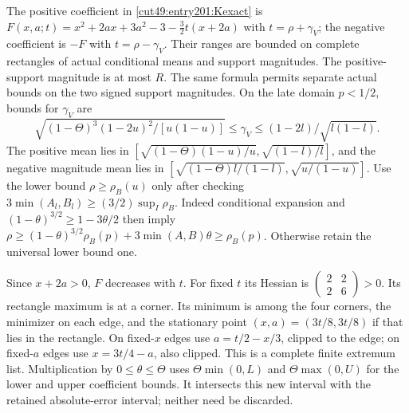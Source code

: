 \documentclass[11pt,a4paper]{article}
\numberwithin{equation}{section}
\theoremstyle{definition}
\theoremstyle{remark}
\begin{document}
The positive coefficient in \eqref{cut49:entry201:Kexact} is
$F(x,a;t)=x^2+2ax+3a^2-3-\tfrac32t(x+2a)$
with $t=\rho+\gamma_V$; the negative coefficient is $-F$
with $t=\rho-\gamma_V$. Their ranges are bounded on complete
rectangles of actual conditional means and support magnitudes.
The positive-support magnitude is at most $R$.
The same formula permits separate actual bounds on the two signed support magnitudes.
On the late domain $p<1/2$, bounds for $\gamma_V$ are
\[
 \sqrt{(1-\Theta)^3(1-2u)^2/[u(1-u)]}
 \le\gamma_V\le(1-2l)/\sqrt{l(1-l)}.
\]
The positive mean lies in
$[\sqrt{(1-\Theta)(1-u)/u},\sqrt{(1-l)/l}]$, and the negative
magnitude mean lies in
$[\sqrt{(1-\Theta)l/(1-l)},\sqrt{u/(1-u)}]$.
Use the lower bound $\rho\ge\rho_B(u)$ only after checking
$3\min(A_l,B_l)\ge(3/2)\sup_I\rho_B$. Indeed conditional expansion
and $(1-\theta)^{3/2}\ge1-3\theta/2$ then imply
$\rho\ge(1-\theta)^{3/2}\rho_B(p)+3\min(A,B)\theta\ge\rho_B(p)$.
Otherwise retain the universal lower bound one.

Since $x+2a>0$, $F$ decreases with $t$.
For fixed $t$ its Hessian is
$\left(\begin{smallmatrix}2&2\\2&6\end{smallmatrix}\right)>0$.
Its rectangle maximum is at a corner. Its minimum is among the four
corners, the minimizer on each edge, and the stationary point
$(x,a)=(3t/8,3t/8)$ if that lies in the rectangle.
On fixed-$x$ edges use $a=t/2-x/3$, clipped to the edge; on
fixed-$a$ edges use $x=3t/4-a$, also clipped.
This is a complete finite extremum list.
Multiplication by $0\le\theta\le\Theta$ uses
$\Theta\min(0,L)$ and $\Theta\max(0,U)$ for the lower and upper
coefficient bounds. It intersects this new interval with the retained
absolute-error interval; neither need be discarded.
\end{document}
